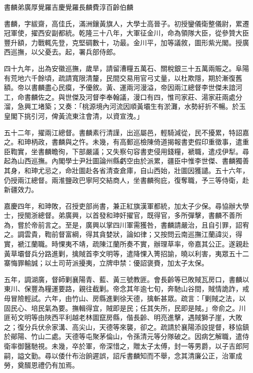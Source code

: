 
\begin{pinyinscope}
書麟弟廣厚覺羅吉慶覺羅長麟費淳百齡伯麟

書麟，字紱齋，高佳氏，滿洲鑲黃旗人，大學士高晉子。初授鑾儀衛整儀尉，累遷冠軍使，擢西安副都統。乾隆三十八年，大軍征金川，命為領隊大臣，從參贊大臣豐升額，力戰輒先登，克堅碉數十，功最。金川平，加等議敘，圖形紫光閣。授廣西巡撫，以父憂去。起，署兵部侍郎。

四十九年，出為安徽巡撫，歲旱，請留漕糧五萬石、關稅銀三十五萬兩賑之。阜陽有荒地六千餘頃，疏請寬限清釐，民間交易用官弓丈量，以杜欺隱，期於漸復舊額。帝以書麟盡心民瘼，予優敘。黃、運兩河漫溢，帝因兩江總督李世傑未諳河工，命書麟佐之。與世傑及河督李奉翰議，漫口有四，惟司家莊、湯家莊兩處分溜，急興工堵築；又奏：「桃源境內河流因順黃壩生有淤灘，水勢紆折不暢。於玉皇閣下挑引河，俾黃流東注會清，以資宣洩。」

五十二年，擢兩江總督。書麟素行清謹，出巡屬邑，輕騎減從，民不擾累，特詔嘉之。和珅柄政，書麟與之忤。未幾，有高郵巡檢陳倚道揭報書吏假印重徵事，遣重臣鞫實，坐書麟瞻徇，下部嚴議；又失察句容書吏侵用錢糧，褫職，遣戍伊犁。尋起為山西巡撫。內閣學士尹壯圖論州縣虧空由於派累，疆臣中惟李世傑、書麟獨善其身，和珅尤忌之，命壯圖赴各省清查倉庫，自山西始，壯圖因獲譴。五十六年，仍授兩江總督。兩淮鹽政巴寧阿交結商人，坐書麟徇庇，復奪職，予三等侍衛，赴新疆效力。

嘉慶四年，和珅敗，召授吏部尚書，兼正紅旗漢軍都統，加太子少保。尋協辦大學士，授閩浙總督。弟廣興，以首發和珅奸擢官，既得官，多所彈擊，書麟不善所為，嘗於帝前言之。至是，廣興以掌四川軍需獲咎，書麟請嚴治，且自引罪，詔宥之。調雲貴，鞫前督富綱，得其貪婪狀，論如律；又按問云南巡撫江蘭諱災，得實，褫江蘭職。時惈夷不靖，疏陳江蘭所奏不實，辦理草率，帝嘉其公正。遂親赴黃草壩督兵分路進剿，擒賊首李文明等，遣降惈入箐招諭，曉以利害，夷眾五十二寨悔罪輸誠；以土司苛派擾夷，立牌申禁：優詔褒賚，加太子太保。

五年，調湖廣，督師剿襄陽青、藍、黃三號教匪。會長齡等已敗賊瓦房口，書麟以東川、保豐為糧運要路，親往截剿。帝念其年逾七旬，奔馳山谷間，賊情詭詐，戒毋冒險輕試。六年，由竹山、房縣進剿徐天德，擒斬甚眾。疏言：「剿賊之法，以固民心、培民氣為要。撫輯得宜，賊即是民；任其失所，民即是賊。」帝俞之。川匪茍文明等由陜西平利越老林圖竄房縣，偕長齡、明亮進擊，遇賊獅子崖，大敗之；復分兵伏佘家溝、高尖山，天德等來襲，卻之。疏請於襄陽添設提督，移協鎮於鄖陽、竹山二處。天德等屯聚茅倫山，令孫清元等分隊破之。因病乞解職，遣侍衛率御醫馳視。未幾，卒於軍，帝深惜之，贈太子太傅，封一等男爵，以子吉郎阿嗣，謚文勤。尋以倭什布治餉遲誤，詔斥書麟知而不舉，念其清廉公正，治軍成勞，奠醊恩禮仍有加焉。


\end{pinyinscope}
